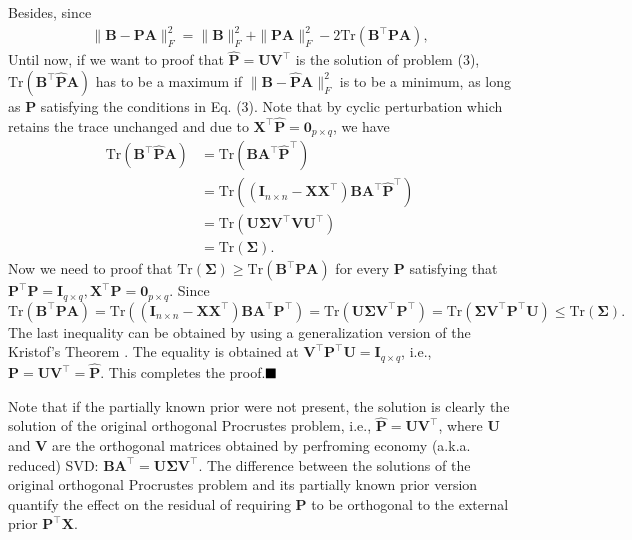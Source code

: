 \documentclass[titlepage,11pt,twoside]{article}
\begin{document}
Besides, since
\begin{equation}
\begin{split}
\|\mathbf{B}-\mathbf{P}\mathbf{A}\|_{F}^{2}
=\|\mathbf{B}\|_{F}^{2}+\|\mathbf{P}\mathbf{A}\|_{F}^{2}-2\text{Tr}(\mathbf{B}^{\top}\mathbf{P}\mathbf{A}),
\end{split}
\end{equation}
Until now, if we want to proof that $\mathbf{\hat{P}}=\mathbf{U}\mathbf{V}^{\top}$ is the solution of problem (3), $\text{Tr}(\mathbf{B}^{\top}\mathbf{\hat{P}}\mathbf{A})$ has to be a maximum if $\|\mathbf{B}-\mathbf{\hat{P}}\mathbf{A}\|_{F}^{2}$ is to be a minimum, as long as $\mathbf{P}$ satisfying the conditions in Eq. (3).
Note that by cyclic perturbation which retains the trace unchanged and due to $\mathbf{X}^{\top}\mathbf{\hat{P}}=\mathbf{0}_{p\times q}$, we have 
\begin{equation}
\begin{split}
\text{Tr}(\mathbf{B}^{\top}\mathbf{\hat{P}}\mathbf{A})
&
=
\text{Tr}(\mathbf{B}\mathbf{A}^{\top}\mathbf{\hat{P}}^{\top})
\\
&
=
\text{Tr}((\mathbf{I}_{n\times n}-\mathbf{X}\mathbf{X}^{\top})\mathbf{B}\mathbf{A}^{\top}\mathbf{\hat{P}}^{\top})
\\
&
=
\text{Tr}(\mathbf{U}\mathbf{\Sigma}\mathbf{V}^{\top}\mathbf{V}\mathbf{U}^{\top})
\\
&
=
\text{Tr}(\mathbf{\Sigma}).
\end{split}
\end{equation}
Now we need to proof that $\text{Tr}(\mathbf{\Sigma})\ge\text{Tr}(\mathbf{B}^{\top}\mathbf{P}\mathbf{A})$ for every $\mathbf{P}$ satisfying that $\mathbf{P}^{\top}\mathbf{P} = \mathbf{I}_{q\times q}, \mathbf{X}^{\top}\mathbf{P} = \mathbf{0}_{p\times q}$. 
Since $\text{Tr}(\mathbf{B}^{\top}\mathbf{P}\mathbf{A})
=
\text{Tr}((\mathbf{I}_{n\times n}-\mathbf{X}\mathbf{X}^{\top})\mathbf{B}\mathbf{A}^{\top}\mathbf{P}^{\top})
=
\text{Tr}(\mathbf{U}\mathbf{\Sigma}\mathbf{V}^{\top}\mathbf{P}^{\top})
=
\text{Tr}(\mathbf{\Sigma}\mathbf{V}^{\top}\mathbf{P}^{\top}\mathbf{U})
\le
\text{Tr}(\mathbf{\Sigma})
.
$
The last inequality can be obtained by using a generalization version \cite{TenBerge1983} of the Kristof's Theorem \cite{Kristof1970515}. The equality is obtained at 
$\mathbf{V}^{\top}\mathbf{P}^{\top}\mathbf{U}=\mathbf{I}_{q\times q}$, i.e., $\mathbf{P}=\mathbf{U}\mathbf{V}^{\top}=\mathbf{\hat{P}}$. This completes the proof.$\hfill\blacksquare$ 

Note that if the partially known prior were not present, the solution is clearly the solution of the original orthogonal Procrustes problem, i.e., $\mathbf{\hat{P}} = \mathbf{U}\mathbf{V}^{\top}$, where $\mathbf{U}$ and $\mathbf{V}$ are the orthogonal matrices obtained by perfroming economy (a.k.a. reduced) SVD:
$\mathbf{B}\mathbf{A}^{\top} = \mathbf{U}\mathbf{\mathbf{\Sigma}}\mathbf{V}^{\top}$. 
The difference between the solutions of the original orthogonal Procrustes problem and its partially known prior version quantify the effect on the residual of requiring $\mathbf{P}$ to be orthogonal to the external prior $\mathbf{P}^{\top}\mathbf{X}$.
\end{document}
